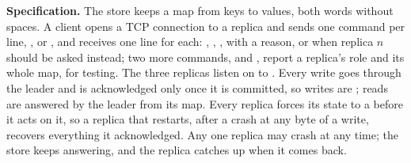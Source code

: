 \textbf{Specification.} The store keeps a map from keys to values, both words without spaces. A client opens a TCP connection to a replica and sends one command per line, ,  or , and receives one line for each: , , ,  with a reason, or  when replica $n$ should be asked instead; two more commands,  and , report a replica's role and its whole map, for testing. The three replicas listen on  to . Every write goes through the  leader and is acknowledged only once it is committed, so writes are ; reads are answered by the leader from its map. Every replica forces its  state to a  before it acts on it, so a replica that restarts, after a crash at any byte of a write, recovers everything it acknowledged. Any one replica may crash at any time; the store keeps answering, and the replica catches up when it comes back.

